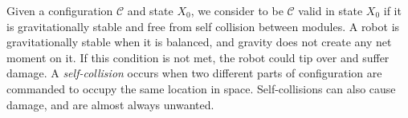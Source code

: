 \documentclass[graybox]{svmult}
\newcommand{\TODO}[1]{ {\bf \textcolor{red}{TODO:} #1 }}
\begin{document}
Given a configuration $\mathcal{C}$ and state \(X_0\), we consider to be  $\mathcal{C}$ valid in state \(X_0\) if it is gravitationally stable and free from self
collision between modules.  A robot is gravitationally
stable when it is balanced, and gravity does not create any net moment on it.
If this condition is not met, the robot could tip over and suffer damage.
%
A \textit{self-collision}
occurs when two different parts of configuration are commanded to occupy the
same location in space.  Self-collisions can also cause damage, and are almost
always unwanted.



\end{document}
